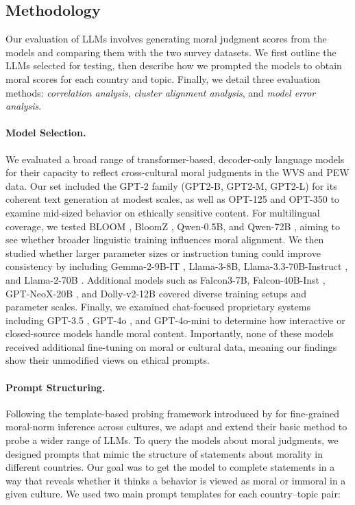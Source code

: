 \documentclass[a4paper,10pt,twoside]{article}
\begin{document}
\subsection{Methodology}

Our evaluation of LLMs involves generating moral judgment scores from the models and comparing them with the two survey datasets. We first outline the LLMs selected for testing, then describe how we prompted the models to obtain moral scores for each country and topic. Finally, we detail three evaluation methods: \emph{correlation analysis}, \emph{cluster alignment analysis}, and \emph{model error analysis}.

\paragraph{Model Selection.}
We evaluated a broad range of transformer-based, decoder-only language models for their capacity to reflect cross-cultural moral judgments in the WVS and PEW data. Our set included the GPT-2 family (GPT2-B, GPT2-M, GPT2-L) \cite{Radford2019} for its coherent text generation at modest scales, as well as OPT-125 and OPT-350 \cite{Zhang2022} to examine mid-sized behavior on ethically sensitive content. For multilingual coverage, we tested BLOOM \cite{LeScao2022}, BloomZ \cite{Muennighoff2023}, Qwen-0.5B, and Qwen-72B \cite{Bai2023}, aiming to see whether broader linguistic training influences moral alignment. We then studied whether larger parameter sizes or instruction tuning could improve consistency by including Gemma-2-9B-IT \cite{Mesnard2024}, Llama-3-8B, Llama-3.3-70B-Instruct \cite{Touvron2023a}, and Llama-2-70B \cite{Touvron2023b}. Additional models such as Falcon3-7B, Falcon-40B-Inst \cite{Almazrouei2023}, GPT-NeoX-20B \cite{Black2022}, and Dolly-v2-12B \cite{Conover2023b} covered diverse training setups and parameter scales. Finally, we examined chat-focused proprietary systems including GPT-3.5 \cite{brown2020language}, GPT-4o \cite{OpenAI2024b}, and GPT-4o-mini \cite{OpenAI2024a} to determine how interactive or closed-source models handle moral content. Importantly, none of these models received additional fine-tuning on moral or cultural data, meaning our findings show their unmodified views on ethical prompts.

\paragraph{Prompt Structuring.}
Following the template-based probing framework introduced by  for fine-grained moral-norm inference across cultures, we adapt and extend their basic method to probe a wider range of LLMs. To query the models about moral judgments, we designed prompts that mimic the structure of statements about morality in different countries. Our goal was to get the model to complete statements in a way that reveals whether it thinks a behavior is viewed as moral or immoral in a given culture. We used two main prompt templates for each country--topic pair:
\end{document}
